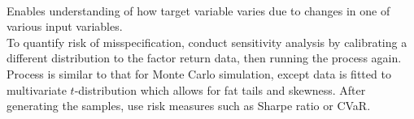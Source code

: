 \begin{remark} \\
Enables understanding of how target variable varies due to changes in one of various input variables.\\
To quantify risk of misspecification, conduct sensitivity analysis by calibrating a different distribution to the factor return data, then running the process again.\\
Process is similar to that for Monte Carlo simulation, except data is fitted to multivariate $t$-distribution which allows for fat tails and skewness. After generating the samples, use risk measures such as Sharpe ratio or CVaR.
\end{remark}